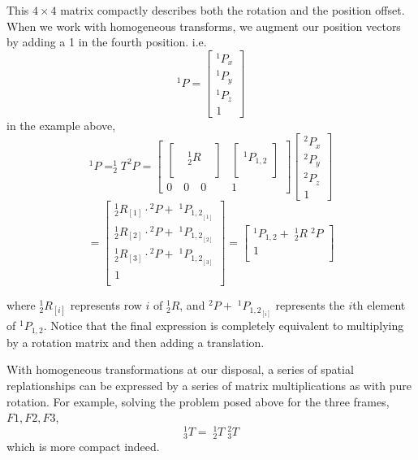 This $4\times4$ matrix compactly describes both the rotation and the position offset.  When we work with homogeneous transforms, we augment our position vectors by adding a 1 in the fourth position. i.e.
\[
^1P = \begin{bmatrix} ^1P_x \\^1P_y \\ ^1P_z \\ 1 \end{bmatrix}
\]
in the example above,
\[^1P = ^1_2T^2P =
\begin{bmatrix}
\begin{bmatrix}  &  &  \\  & ^1_2R&  \\ & & \\ \end{bmatrix}      &
 \begin{bmatrix}  \\ ^1P_{1,2} \\  \\ \end{bmatrix}            \\
 0 \quad 0 \quad 0      &   1
\end{bmatrix}
\begin{bmatrix} ^2P_x \\^2P_y \\ ^2P_z \\ 1 \end{bmatrix}
\]
\[
= \begin{bmatrix}
^1_2R_{[1]}\cdot{}^2P+\;{}^1P_{{1,2}_{[1]}} \\
^1_2R_{[2]}\cdot{}^2P+\;{}^1P_{{1,2}_{[2]}} \\
^1_2R_{[3]}\cdot{}^2P+\;{}^1P_{{1,2}_{[3]}} \\
1\\
\end{bmatrix}
=
\begin{bmatrix}
^1P_{1,2}+ \;{}^1_2R \;{}^2P \\ 1 \\
\end{bmatrix}
\]

where $^1_2R_{[i]}$ represents row $i$ of $^1_2R$, and $^2P+\;{}^1P_{{1,2}_{[i]}}$ represents the $i$th element of $^1P_{1,2}$.
Notice that the final expression is completely equivalent to multiplying by a rotation matrix and then adding a translation.

With homogeneous transformations at our disposal, a series of spatial replationships can be expressed by a series of matrix multiplications as with pure rotation.  For example, solving the problem posed above for the three frames, $F1, F2, F3$,
\[
^1_3T = \; {}^1_2T\;^2_3T
\]
which is more compact indeed.

